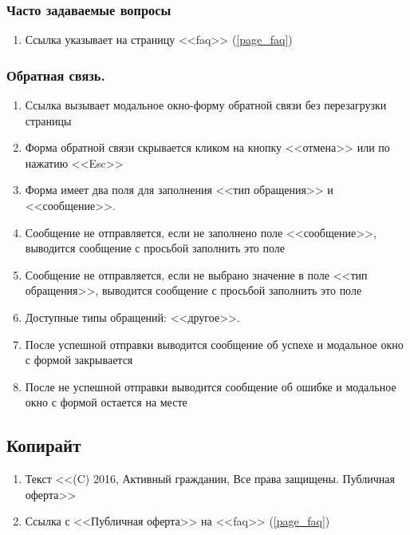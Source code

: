             \subsubsection{Часто задаваемые вопросы}
                \begin{enumerate}
                    \item Ссылка указывает на страницу <<faq>> (\ref{page_faq})
                \end{enumerate}
            \subsubsection{Обратная связь.}
                \begin{enumerate}
                    \item Ссылка вызывает модальное окно-форму обратной связи без перезагрузки страницы
                    \item Форма обратной связи скрывается кликом на кнопку <<отмена>> или по нажатию <<Esc>>
                    \item Форма имеет два поля для заполнения <<тип обращения>> и <<сообщение>>.
                    \item Сообщение не отправляется, если не заполнено поле <<сообщение>>, выводится сообщение с просьбой заполнить это поле
                    \item Сообщение не отправляется, если не выбрано значение в поле <<тип обращения>>, выводится сообщение с просьбой заполнить это поле
                    \item Доступные типы обращений: <<другое>>.
                    \item После успешной отправки выводится сообщение об успехе и модальное окно с формой закрывается
                    \item После не успешной отправки выводится сообщение об ошибке и модальное окно с формой остается на месте
                \end{enumerate}

        \subsection{Копирайт}
            \label{baseitems_footer_copiright}
            \begin{enumerate}
                \item Текст <<(C) 2016, Активный гражданин, Все права защищены. Публичная оферта>>
                \item Ссылка с <<Публичная оферта>> на <<faq>> (\ref{page_faq})
            \end{enumerate}
